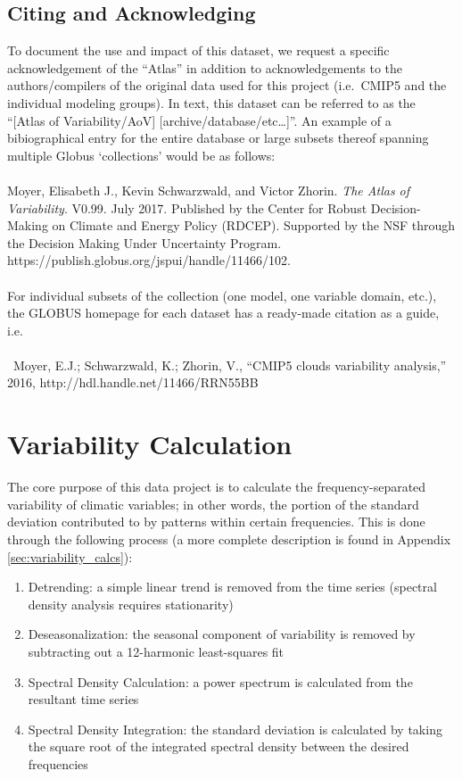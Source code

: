 \documentclass[11pt]{amsart}
\begin{document}
\subsection{Citing and Acknowledging}
To document the use and impact of this dataset, we request a specific acknowledgement of the ``Atlas'' in addition to acknowledgements to the authors/compilers of the original data used for this project (i.e.\ CMIP5 and the individual modeling groups). In text, this dataset can be referred to as the  ``[Atlas of Variability/AoV] [archive/database/etc\dots]''. An example of a bibiographical entry for the entire database or large subsets thereof spanning multiple Globus `collections' would be as follows: 
\\ \\
Moyer, Elisabeth J., Kevin Schwarzwald, and Victor Zhorin. \textit{The Atlas of Variability}. V0.99. July 2017. Published by the Center for Robust Decision-Making on Climate and Energy Policy (RDCEP). Supported by the NSF through the Decision Making Under Uncertainty Program. https://publish.globus.org/jspui/handle/11466/102.
\\\\
For individual subsets of the collection (one model, one variable domain, etc.), the GLOBUS homepage for each dataset has a ready-made citation as a guide, i.e.\ 
\\\\\
Moyer, E.J.; Schwarzwald, K.; Zhorin, V., ``CMIP5 clouds variability analysis,'' 2016, http://hdl.handle.net/11466/RRN55BB


\section{Variability Calculation}
The core purpose of this data project is to calculate the frequency-separated variability of climatic variables; in other words, the portion of the standard deviation contributed to by patterns within certain frequencies. This is done through the following process (a more complete description is found in Appendix \ref{sec:variability_calcs}):

\begin{enumerate}
\item Detrending: a simple linear trend is removed from the time series (spectral density analysis requires stationarity)
\item Deseasonalization: the seasonal component of variability is removed by subtracting out a 12-harmonic least-squares fit
\item Spectral Density Calculation: a power spectrum is calculated from the resultant time series
\item Spectral Density Integration: the standard deviation is calculated by taking the square root of the integrated spectral density between the desired frequencies
\end{enumerate}
\end{document}

